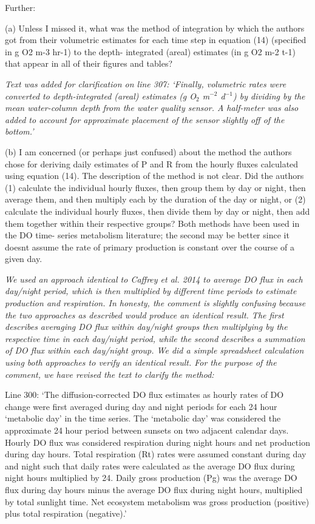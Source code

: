 \documentclass[letterpaper,12pt]{article}\usepackage[]{graphicx}\usepackage[]{color}
\begin{document}
Further:

(a) Unless I missed it, what was the method of integration by which the authors got from their volumetric estimates for each time step in equation (14) (specified in g O2 m-3 hr-1) to the depth- integrated (areal) estimates (in g O2 m-2 t-1) that appear in all of their figures and tables?

{\it Text was added for clarification on line 307: `Finally, volumetric rates were converted to depth-integrated (areal) estimates (g O$_2$ m$^{-2}$ d$^{-1}$) by dividing by the mean water-column depth from the water quality sensor.  A half-meter was also added to account for approximate placement of the sensor slightly off of the bottom.' 
}

(b) I am concerned (or perhaps just confused) about the method the authors chose for deriving daily estimates of P and R from the hourly fluxes calculated using equation (14). The description of the method is not clear. Did the authors (1) calculate the individual hourly fluxes, then group them by day or night, then average them, and then multiply each by the duration of the day or night, or (2) calculate the individual hourly fluxes, then divide them by day or night, then add them together within their respective groups? Both methods have been used in the DO time- series metabolism literature; the second may be better since it doesnt assume the rate of primary production is constant over the course of a given day.

{\it We used an approach identical to Caffrey et al. 2014 to average DO flux in each day/night period, which is then multiplied by different time periods to estimate production and respiration.  In honesty, the comment is slightly confusing because the two approaches as described would produce an identical result.  The first describes averaging DO flux within day/night groups then multiplying by the respective time in each day/night period, while the second describes a summation of DO flux within each day/night group.  We did a simple spreadsheet calculation using both approaches to verify an identical result.  For the purpose of the comment, we have revised the text to clarify the method:

Line 300: `The diffusion-corrected DO flux estimates as hourly rates of DO change were first averaged during day and night periods for each 24 hour `metabolic day' in the time series. The `metabolic day' was considered the approximate 24 hour period between sunsets on two adjacent calendar days.  Hourly DO flux was considered respiration during night hours and net production during day hours.  Total respiration (Rt) rates were assumed constant during day and night such that daily rates were calculated as the average DO flux during night hours multiplied by 24. Daily gross production (Pg) was the average DO flux during day hours minus the average DO flux during night hours, multiplied by total sunlight time.  Net ecosystem metabolism was gross production (positive) plus total respiration (negative).'
}
\end{document}
